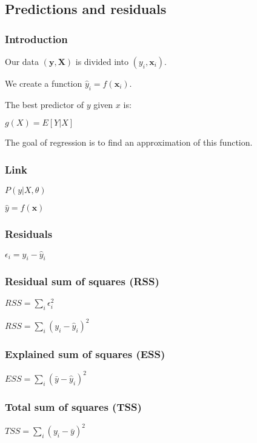 
\subsection{Predictions and residuals}

\subsubsection{Introduction}

Our data \((\mathbf y, \mathbf X)\) is divided into \((y_i, \mathbf x_i)\).

We create a function \(\hat y_i = f(\mathbf x_i)\).

The best predictor of \(y\) given \(x\) is:

\(g(X)=E[Y|X]\)

The goal of regression is to find an approximation of this function.

\subsubsection{Link}

\(P(y|X, \theta )\)

\(\hat y =f(\mathbf x)\)

\subsubsection{Residuals}

\(\epsilon_i = y_i- \hat y_i\)

\subsubsection{Residual sum of squares (RSS)}

\(RSS=\sum_i \epsilon_i^2\)

\(RSS=\sum_i (y_i-\hat y_i)^2\)

\subsubsection{Explained sum of squares (ESS)}

\(ESS=\sum_i (\bar y-\hat y_i)^2\)

\subsubsection{Total sum of squares (TSS)}

\(TSS=\sum_i (y_i-\bar y)^2\)

